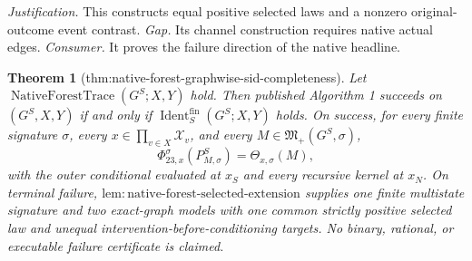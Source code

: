 \documentclass{article}
\newtheorem{theorem}{Theorem}
\begin{document}
\par\smallskip\noindent \textit{Justification.} This constructs equal positive selected laws and a nonzero original-outcome event contrast. \textit{Gap.} Its channel construction requires native actual edges. \textit{Consumer.} It proves the failure direction of the native headline.

\begin{theorem}[thm:native-forest-graphwise-sid-completeness]\label{thm:native-forest-graphwise-sid-completeness}
Let \(\operatorname{NativeForestTrace}(G^S;X,Y)\) hold. Then published Algorithm 1 succeeds on \((G^S,X,Y)\) if and only if \(\operatorname{Ident}^{\mathrm{fin}}_S(G^S;X,Y)\) holds. On success, for every finite signature \(\sigma\), every \(x\in\prod_{v\in X}\mathcal X_v\), and every \(M\in\mathfrak M_+(G^S,\sigma)\),
\[
 \Phi_{23,x}^{\sigma}(P_{M,\sigma}^S)=\Theta_{x,\sigma}(M),
\]
with the outer conditional evaluated at \(x_S\) and every recursive kernel at \(x_N\). On terminal failure, \(\mathrm{lem:native\text{-}forest\text{-}selected\text{-}extension}\) supplies one finite multistate signature and two exact-graph models with one common strictly positive selected law and unequal intervention-before-conditioning targets. No binary, rational, or executable failure certificate is claimed.
\end{theorem}
\end{document}

